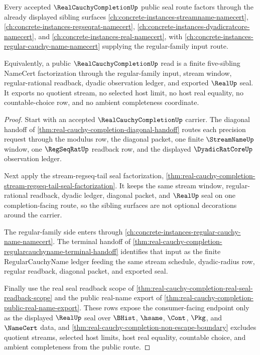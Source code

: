 \begin{theorem}
\label{thm:real-cauchy-completion-sibling-lattice-route}
Every accepted $\RealCauchyCompletionUp$ public seal route factors through the already displayed sibling surfaces \autoref{ch:concrete-instances-streamname-namecert}, \autoref{ch:concrete-instances-regseqrat-namecert}, \autoref{ch:concrete-instances-dyadicratcore-namecert}, and \autoref{ch:concrete-instances-real-namecert}, with \autoref{ch:concrete-instances-regular-cauchy-name-namecert} supplying the regular-family input route.

Equivalently, a public $\RealCauchyCompletionUp$ read is a finite five-sibling NameCert factorization through the regular-family input, stream window, regular-rational readback, dyadic observation ledger, and exported $\RealUp$ seal. It exports no quotient stream, no selected host limit, no host real equality, no countable-choice row, and no ambient completeness coordinate.
\end{theorem}
\begin{proof}
Start with an accepted $\RealCauchyCompletionUp$ carrier. The diagonal handoff of \autoref{thm:real-cauchy-completion-diagonal-handoff} routes each precision request through the modulus row, the diagonal packet, one finite $\StreamNameUp$ window, one $\RegSeqRatUp$ readback row, and the displayed $\DyadicRatCoreUp$ observation ledger.

Next apply the stream-regseq-tail seal factorization, \autoref{thm:real-cauchy-completion-stream-regseq-tail-seal-factorization}. It keeps the same stream window, regular-rational readback, dyadic ledger, diagonal packet, and $\RealUp$ seal on one completion-facing route, so the sibling surfaces are not optional decorations around the carrier.

The regular-family side enters through \autoref{ch:concrete-instances-regular-cauchy-name-namecert}. The terminal handoff of \autoref{thm:real-cauchy-completion-regularcauchyname-terminal-handoff} identifies that input as the finite RegularCauchyName ledger feeding the same stream schedule, dyadic-radius row, regular readback, diagonal packet, and exported seal.

Finally use the real seal readback scope of \autoref{thm:real-cauchy-completion-real-seal-readback-scope} and the public real-name export of \autoref{thm:real-cauchy-completion-public-real-name-export}. These rows expose the consumer-facing endpoint only as the displayed $\RealUp$ seal over $\BHist$, $\hsame$, $\Cont$, $\Pkg$, and $\NameCert$ data, and \autoref{thm:real-cauchy-completion-non-escape-boundary} excludes quotient streams, selected host limits, host real equality, countable choice, and ambient completeness from the public route.
\end{proof}
